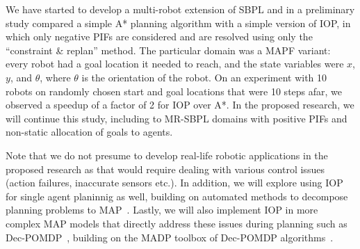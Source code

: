 \documentclass[11pt]{article}
\begin{document}
We have started to develop a multi-robot extension of SBPL and in a preliminary study compared a simple A* planning algorithm with a simple version of IOP, in which only negative PIFs are considered and are resolved using only the ``constraint \& replan''  method. The particular domain was a MAPF variant: every robot had a goal location it needed to reach, and the state variables were $x$, $y$, and $\theta$, where $\theta$ is the orientation of the robot. On an experiment with 10 robots on randomly chosen start and goal locations that were 10 steps afar, we observed a speedup of a factor of 2 for IOP over A*. In the proposed research, we will continue this study, including to MR-SBPL domains with positive PIFs and non-static allocation of goals to agents.



Note that we do not presume to develop real-life robotic applications in the proposed research as that would require dealing with various control issues (action failures, inaccurate sensors etc.). In addition, we will explore using IOP for single agent planinnig as well, building on automated methods to decompose planning problems to MAP~\cite{nissim2012tunneling}. Lastly, we will also implement IOP in more complex MAP models that directly address these issues during planning such as Dec-POMDP~\cite{bernstein2002complexity}, building on the MADP toolbox of Dec-POMDP algorithms~\cite{MADPToolbox-0.3.1}.
\end{document}
